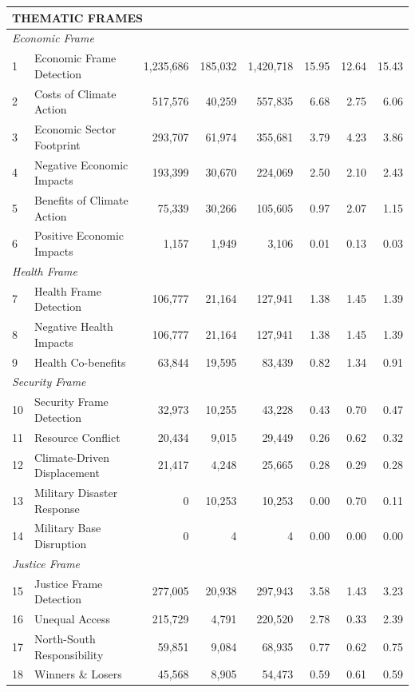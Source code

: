 {\begin{longtable}{p{0.5cm}p{5.5cm}rrrrrr}
\multicolumn{8}{l}{\cellcolor{gray!10}\textbf{THEMATIC FRAMES}} \\
\midrule
\multicolumn{8}{l}{\textit{Economic Frame}} \\
1 & Economic Frame Detection & 1,235,686 & 185,032 & 1,420,718 & 15.95 & 12.64 & 15.43 \\
2 & Costs of Climate Action & 517,576 & 40,259 & 557,835 & 6.68 & 2.75 & 6.06 \\
3 & Economic Sector Footprint & 293,707 & 61,974 & 355,681 & 3.79 & 4.23 & 3.86 \\
4 & Negative Economic Impacts & 193,399 & 30,670 & 224,069 & 2.50 & 2.10 & 2.43 \\
5 & Benefits of Climate Action & 75,339 & 30,266 & 105,605 & 0.97 & 2.07 & 1.15 \\
6 & Positive Economic Impacts & 1,157 & 1,949 & 3,106 & 0.01 & 0.13 & 0.03 \\
\midrule
\multicolumn{8}{l}{\textit{Health Frame}} \\
7 & Health Frame Detection & 106,777 & 21,164 & 127,941 & 1.38 & 1.45 & 1.39 \\
8 & Negative Health Impacts & 106,777 & 21,164 & 127,941 & 1.38 & 1.45 & 1.39 \\
9 & Health Co-benefits & 63,844 & 19,595 & 83,439 & 0.82 & 1.34 & 0.91 \\
\midrule
\multicolumn{8}{l}{\textit{Security Frame}} \\
10 & Security Frame Detection & 32,973 & 10,255 & 43,228 & 0.43 & 0.70 & 0.47 \\
11 & Resource Conflict & 20,434 & 9,015 & 29,449 & 0.26 & 0.62 & 0.32 \\
12 & Climate-Driven Displacement & 21,417 & 4,248 & 25,665 & 0.28 & 0.29 & 0.28 \\
13 & Military Disaster Response & 0 & 10,253 & 10,253 & 0.00 & 0.70 & 0.11 \\
14 & Military Base Disruption & 0 & 4 & 4 & 0.00 & 0.00 & 0.00 \\
\midrule
\multicolumn{8}{l}{\textit{Justice Frame}} \\
15 & Justice Frame Detection & 277,005 & 20,938 & 297,943 & 3.58 & 1.43 & 3.23 \\
16 & Unequal Access & 215,729 & 4,791 & 220,520 & 2.78 & 0.33 & 2.39 \\
17 & North-South Responsibility & 59,851 & 9,084 & 68,935 & 0.77 & 0.62 & 0.75 \\
18 & Winners \& Losers & 45,568 & 8,905 & 54,473 & 0.59 & 0.61 & 0.59 \\

\end{longtable}}
